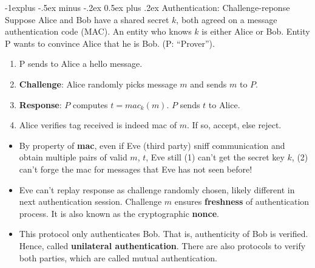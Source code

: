 \documentclass[10pt, landscape]{article}
\makeatletter
\renewcommand{\subsection}{\@startsection{subsection}{2}{0mm}%
                                {-1explus -.5ex minus -.2ex}%
                                {0.5ex plus .2ex}%
                                {\normalfont\normalsize\bfseries}}
\makeatother
\begin{document}
\begin{multicols*}{3}
\subsection{Authentication: Challenge-reponse}
Suppose Alice and Bob have a shared secret $k$, both agreed on a message authentication code (MAC). An entity who knows $k$ is either Alice or Bob. Entity P
wants to convince Alice that he is Bob. (P: “Prover”).
\begin{enumerate}
\item P sends to Alice a hello message.
\item \textbf{Challenge}: Alice randomly picks message $m$ and sends $m$ to $P$.
\item \textbf{Response}: $P$ computes $t = mac_k(m)$. $P$ sends $t$ to Alice.
\item Alice verifies tag received is indeed mac of $m$. If so, accept, else reject.
\end{enumerate}
\begin{itemize}
\item By property of \textbf{mac}, even if Eve (third party) sniff communication and obtain multiple pairs of valid $m$, $t$, Eve still (1) can’t get the secret key $k$, (2) can’t forge the mac for messages that Eve has not seen before!
\item Eve can’t replay response as challenge randomly chosen, likely different in next authentication session. Challenge $m$ ensures \textbf{freshness} of authentication process. It is also known as the cryptographic \textbf{nonce}.
\item This protocol only authenticates Bob. That is, authenticity of Bob is verified. Hence, called \textbf{unilateral authentication}. There are also protocols to verify both parties, which are called mutual authentication.
\end{itemize}


\end{multicols*}
\end{document}
